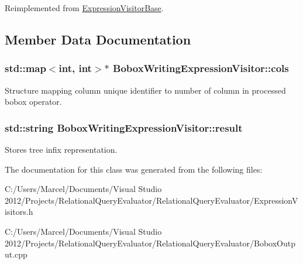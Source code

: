 Reimplemented from \hyperlink{class_expression_visitor_base_a9750397f5588263509a28ca9f17e8bc4}{Expression\+Visitor\+Base}.



\subsection{Member Data Documentation}
\hypertarget{class_bobox_writing_expression_visitor_a6e0d9ba1a06fd32c8d71dd8e1c068c56}{
\subsubsection[{cols}]{\setlength{\rightskip}{0pt plus 5cm}std\+::map$<$int, int$>$$\ast$ Bobox\+Writing\+Expression\+Visitor\+::cols}}\label{class_bobox_writing_expression_visitor_a6e0d9ba1a06fd32c8d71dd8e1c068c56}
Structure mapping column unique identifier to number of column in processed bobox operator. \hypertarget{class_bobox_writing_expression_visitor_a222842d9f796beebabc13691b107e5ad}{
\subsubsection[{result}]{\setlength{\rightskip}{0pt plus 5cm}std\+::string Bobox\+Writing\+Expression\+Visitor\+::result}}\label{class_bobox_writing_expression_visitor_a222842d9f796beebabc13691b107e5ad}
Stores tree infix representation. 

The documentation for this class was generated from the following files\+:\begin{DoxyCompactItemize}
\item 
C\+:/\+Users/\+Marcel/\+Documents/\+Visual Studio 2012/\+Projects/\+Relational\+Query\+Evaluator/\+Relational\+Query\+Evaluator/Expression\+Visitors.\+h\item 
C\+:/\+Users/\+Marcel/\+Documents/\+Visual Studio 2012/\+Projects/\+Relational\+Query\+Evaluator/\+Relational\+Query\+Evaluator/Bobox\+Output.\+cpp\end{DoxyCompactItemize}
